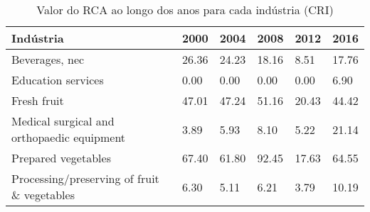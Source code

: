 \begin{table}
\centering
\caption{Valor do RCA ao longo dos anos para cada indústria (CRI)}
\label{tab:ex3-tempo-CRI}
\begin{tabular}{p{6cm}p{1.5cm}p{1.5cm}p{1.5cm}p{1.5cm}p{1.5cm}}
\toprule
                                  Indústria &  2000 &  2004 &  2008 &  2012 &  2016 \\
\midrule
                             Beverages, nec & 26.36 & 24.23 & 18.16 &  8.51 & 17.76 \\
                         Education services &  0.00 &  0.00 &  0.00 &  0.00 &  6.90 \\
                                Fresh fruit & 47.01 & 47.24 & 51.16 & 20.43 & 44.42 \\
 Medical surgical and orthopaedic equipment &  3.89 &  5.93 &  8.10 &  5.22 & 21.14 \\
                        Prepared vegetables & 67.40 & 61.80 & 92.45 & 17.63 & 64.55 \\
Processing/preserving of fruit \& vegetables &  6.30 &  5.11 &  6.21 &  3.79 & 10.19 \\
\bottomrule
\end{tabular}
\end{table}

